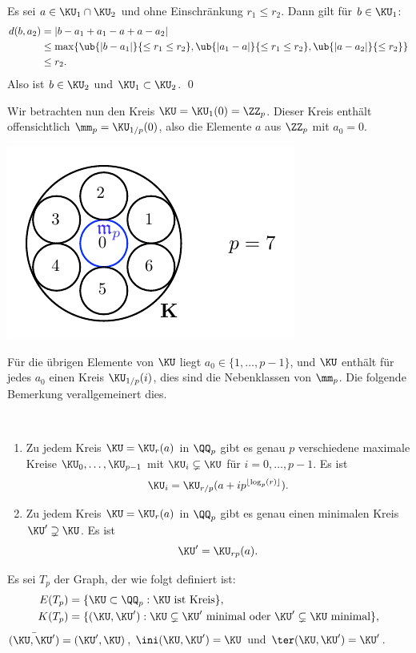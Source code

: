 \bew Es sei $a\in \KU_1\cap\KU_2$ und ohne Einschränkung
$r_1\leq r_2$. Dann gilt für $b\in \KU_1$:
\begin{align*}
d(b,a_2) &= |b-a_1+a_1-a+a-a_2| \\
&\leq \max\{\ub{|b-a_1|}{\leq r_1\leq r_2},
\ub{|a_1-a|}{\leq r_1\leq r_2},
\ub{|a-a_2|}{\leq r_2}\} \\
&\leq r_2.
\end{align*}
Also ist $b\in \KU_2$ und $\KU_1\subset \KU_2$.
\qed

Wir betrachten nun den Kreis $\KU=\KU_1(0)=\ZZ_p$.
Dieser Kreis enthält offensichtlich $\mm_p=\KU_{1/p}(0)$, also
die Elemente $a$ aus $\ZZ_p$ mit $a_0=0$.
\begin{center}
	\includegraphics{grugraImages/kreisQp}
\end{center}
Für die übrigen Elemente von $\KU$ liegt $a_0\in\{1,\ldots,p-1\}$,
und $\KU$ enthält für jedes $a_0$ einen Kreis $\KU_{1/p}(i)$, dies
sind die Nebenklassen von $\mm_p$.
Die folgende Bemerkung verallgemeinert dies.

\BEM\ \label{bem_kreisQp}
\begin{enumerate}
\item Zu jedem Kreis $\KU=\KU_r(a)$ in $\QQ_p$ gibt es genau $p$
verschiedene maximale Kreise $\KU_0,\ldots,\KU_{p-1}$ mit
$\KU_i\subsetneq \KU$ für $i=0,\ldots,p-1$.
Es ist
\[
\KU_i = \KU_{r/p}(a+i p^{\lfloor\log_p(r)\rfloor}).
\]
\item Zu jedem Kreis $\KU=\KU_r(a)$ in $\QQ_p$ gibt es genau einen
minimalen Kreis $\KU'\supsetneq \KU$. Es ist
\[
\KU' = \KU_{rp}(a).
\]
\end{enumerate}

\DEF Es sei $T_p$ der Graph, der wie folgt definiert ist:
\begin{align*}
E(T_p) &= \{ \KU\subset\QQ_p : \KU \text{ ist Kreis} \}, \\
K(T_p) &= \{ (\KU,\KU') : \KU\subsetneq \KU' \text{ minimal oder }
\KU'\subsetneq \KU \text{ minimal} \},
\end{align*}
$\bar{(\KU,\KU')}=(\KU',\KU)$, $\ini(\KU,\KU')=\KU$ und
$\ter(\KU,\KU')=\KU'$.

